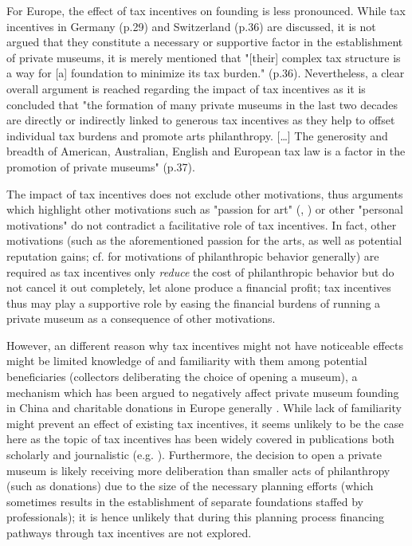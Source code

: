 \documentclass[11pt]{article}
\begin{document}
For Europe, the effect of tax incentives on founding is less pronounced.
While tax incentives in Germany (p.29) and Switzerland (p.36) are discussed, it is not argued that they constitute a necessary or supportive factor in the establishment of private museums, it is merely mentioned that "[their] complex tax structure is a way for [a] foundation to minimize its tax burden." (p.36).
Nevertheless, a clear overall argument is reached regarding the impact of tax incentives as it is concluded that "the formation of many private museums in the last two decades are directly or indirectly linked to generous tax incentives as they help to offset individual tax burdens and promote arts philanthropy. [\ldots{}] The generosity and breadth of American, Australian, English and European tax law is a factor in the promotion of private museums" (p.37). 






The impact of tax incentives does not exclude other motivations, thus arguments which highlight other motivations such as "passion for art" (\cite[p.7]{Zorloni_Resch_2016_opportunities}, \cite[p.12]{Adam_2021_rise}) or other "personal motivations" \parencite[p.144]{Walker_2019_collector} do not contradict a facilitative role of tax incentives. 
In fact, other motivations (such as the aforementioned passion for the arts, as well as potential reputation gains; cf. \cite{Bekkers_Wiepking_2010_literature,Bekkers_Wiepking_2011_philanthropic} for motivations of philanthropic behavior generally) are required as tax incentives only \emph{reduce} the cost of philanthropic behavior but do not cancel it out completely, let alone produce a financial profit; tax incentives thus may play a supportive role by easing the financial burdens of running a private museum as a consequence of other motivations.


However, an different reason why tax incentives might not have noticeable effects might be limited knowledge of and familiarity with them among potential beneficiaries (collectors deliberating the choice of opening a museum), a mechanism which has been argued to negatively affect private museum founding in China \parencite[p.222]{DeNigris_2018_museums} and charitable donations in Europe generally \parencite{Hemels_2017_incentives}.
While lack of familiarity might prevent an effect of existing tax incentives, it seems unlikely to be the case here as the topic of tax incentives has been widely covered in publications both scholarly \parencite{Walker_2019_collector,Reich_2018_philantropy,Zorloni_Resch_2016_opportunities} and journalistic (e.g. \cite{Brown_Pes_2018_taxpayers,Boucher_2020_solow,Honig_2016_IRS}).
Furthermore, the decision to open a private museum is likely receiving more deliberation than smaller acts of philanthropy (such as donations) due to the size of the necessary planning efforts (which sometimes results in the establishment of separate foundations staffed by professionals); it is hence unlikely that during this planning process financing pathways through tax incentives are not explored.
\end{document}
